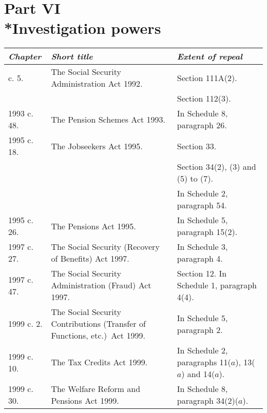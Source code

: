 \documentclass[12pt,a4paper]{article}
\begin{document}


\section[Part VI --- Investigation powers]{Part VI\\*Investigation powers}

\renewcommand\parthead{--- Schedule 9 Part VI}

{\footnotesize
\begin{longtable}{p{43.5645pt}p{185.35036pt}p{125.09244pt}}
\hline
\itshape Chapter	&\itshape Short title	&\itshape Extent of repeal\\
\hline
\endhead
\hline
\endlastfoot
1992 c. 5. 	&The Social Security Administration Act 1992. 	&Section 111A(2).\\
		&&Section 112(3).\\
1993 c. 48. 	&The Pension Schemes Act 1993. 	&In Schedule 8, paragraph 26. \\
1995 c. 18. 	&The Jobseekers Act 1995. 	&Section 33.\\ 
		&&Section 34(2), (3)  and (5)  to (7).\\
		&&In Schedule 2, paragraph 54.\\ 
1995 c. 26. 	&The Pensions Act 1995. 	&In Schedule 5, paragraph 15(2).\\
1997 c. 27. 	&The Social Security (Recovery of Benefits) Act 1997. 	&In Schedule 3, paragraph 4. \\
1997 c. 47. 	&The Social Security Administration (Fraud) Act 1997. 	&Section 12. \newline In Schedule 1, paragraph 4(4).\\
1999 c. 2. 	&The Social Security Contributions (Transfer of Functions, etc.)\ Act 1999. 	&In Schedule 5, paragraph 2. \\
1999 c. 10. 	&The Tax Credits Act 1999. 	&In Schedule 2, paragraphs 11($a$), 13($a$)  and 14($a$).\\
1999 c. 30. 	&The Welfare Reform and Pensions Act 1999. 	&In Schedule 8, paragraph 34(2)($a$).\\
\end{longtable}

}
\end{document}
